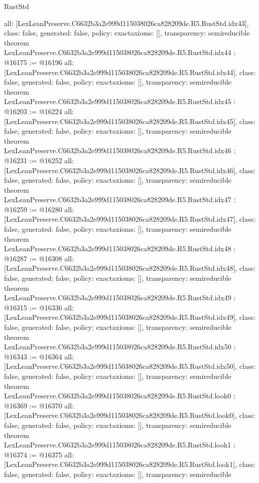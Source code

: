 \begin{lexlean}{RustStd}
\begin{coremodule}
{  all: [LexLeanPreserve.C6632b3a2e999d115038026ca828209de.R5.RustStd.idx43],
  class: false,
  generated: false,
  policy: exact{axioms: []},
  transparency: semireducible
}
theorem LexLeanPreserve.C6632b3a2e999d115038026ca828209de.R5.RustStd.idx44 : @16175 := @16196 {
  all: [LexLeanPreserve.C6632b3a2e999d115038026ca828209de.R5.RustStd.idx44],
  class: false,
  generated: false,
  policy: exact{axioms: []},
  transparency: semireducible
}
theorem LexLeanPreserve.C6632b3a2e999d115038026ca828209de.R5.RustStd.idx45 : @16203 := @16224 {
  all: [LexLeanPreserve.C6632b3a2e999d115038026ca828209de.R5.RustStd.idx45],
  class: false,
  generated: false,
  policy: exact{axioms: []},
  transparency: semireducible
}
theorem LexLeanPreserve.C6632b3a2e999d115038026ca828209de.R5.RustStd.idx46 : @16231 := @16252 {
  all: [LexLeanPreserve.C6632b3a2e999d115038026ca828209de.R5.RustStd.idx46],
  class: false,
  generated: false,
  policy: exact{axioms: []},
  transparency: semireducible
}
theorem LexLeanPreserve.C6632b3a2e999d115038026ca828209de.R5.RustStd.idx47 : @16259 := @16280 {
  all: [LexLeanPreserve.C6632b3a2e999d115038026ca828209de.R5.RustStd.idx47],
  class: false,
  generated: false,
  policy: exact{axioms: []},
  transparency: semireducible
}
theorem LexLeanPreserve.C6632b3a2e999d115038026ca828209de.R5.RustStd.idx48 : @16287 := @16308 {
  all: [LexLeanPreserve.C6632b3a2e999d115038026ca828209de.R5.RustStd.idx48],
  class: false,
  generated: false,
  policy: exact{axioms: []},
  transparency: semireducible
}
theorem LexLeanPreserve.C6632b3a2e999d115038026ca828209de.R5.RustStd.idx49 : @16315 := @16336 {
  all: [LexLeanPreserve.C6632b3a2e999d115038026ca828209de.R5.RustStd.idx49],
  class: false,
  generated: false,
  policy: exact{axioms: []},
  transparency: semireducible
}
theorem LexLeanPreserve.C6632b3a2e999d115038026ca828209de.R5.RustStd.idx50 : @16343 := @16364 {
  all: [LexLeanPreserve.C6632b3a2e999d115038026ca828209de.R5.RustStd.idx50],
  class: false,
  generated: false,
  policy: exact{axioms: []},
  transparency: semireducible
}
theorem LexLeanPreserve.C6632b3a2e999d115038026ca828209de.R5.RustStd.look0 : @16369 := @16370 {
  all: [LexLeanPreserve.C6632b3a2e999d115038026ca828209de.R5.RustStd.look0],
  class: false,
  generated: false,
  policy: exact{axioms: []},
  transparency: semireducible
}
theorem LexLeanPreserve.C6632b3a2e999d115038026ca828209de.R5.RustStd.look1 : @16374 := @16375 {
  all: [LexLeanPreserve.C6632b3a2e999d115038026ca828209de.R5.RustStd.look1],
  class: false,
  generated: false,
  policy: exact{axioms: []},
  transparency: semireducible
}
\end{coremodule}
\end{lexlean}
